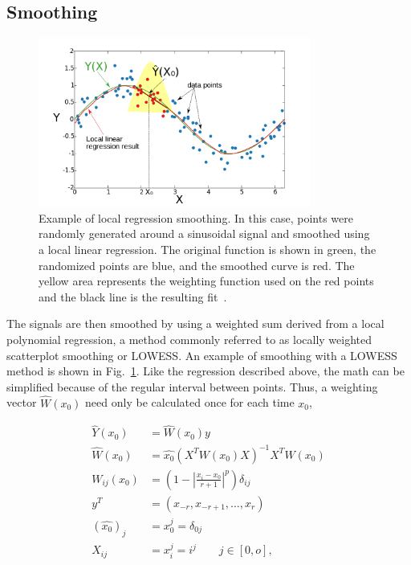 \documentclass[oneside,12pt]{memoir}
\begin{document}
\subsection{Smoothing}
\label{sec:smooth}
\begin{figure}[t]
	\centering
	\includegraphics[width=0.8\textwidth]
		{Localregressionsmoother.png}
	\caption[Example of local regression smoothing]{Example of local regression smoothing. In this case, points were randomly generated around a sinusoidal signal and smoothed using a local linear regression. The original function is shown in green, the randomized points are blue, and the smoothed curve is red. The yellow area represents the weighting function used on the red points and the black line is the resulting fit~\cite{wiki:kernelsmooth}.}
	\label{fig:loess1}
\end{figure}
The signals are then smoothed by using a weighted sum derived from a local polynomial regression, a method commonly referred to as locally weighted scatterplot smoothing or LOWESS. An example of smoothing with a LOWESS method is shown in Fig.~\ref{fig:loess1}. Like the regression described above, the math can be simplified because of the regular interval between points. Thus, a weighting vector $\hat W\left(x_0\right)$ need only be calculated once for each time $x_0$,\par
\begin{subequations}
	\label{eq:loess1}
	\begin{align}
		\hat Y\left(x_0\right)&=\hat W\left(x_0\right) y\\
		\hat W\left(x_0\right)&=\hat{x_0}
			\left(X^T W\left(x_0\right)X\right)^{-1} X^T
			W\left(x_0\right)\\
		W_{ij}\left(x_0\right)&=\left(1-\left|
			\frac{x_i-x_0}{r+1}\right|^{p}\right)\delta_{ij}\\
		y^T&=\left(x_{-r},x_{-r+1},\ldots,x_{r}\right)\\
		\left(\hat{x_0}\right)_j&=x_0^j=\delta_{0j}\\
		X_{ij}&=x_i^j=i^j\quad\quad j\in\left[0,o\right],
	\end{align}
\end{subequations}
\end{document}
